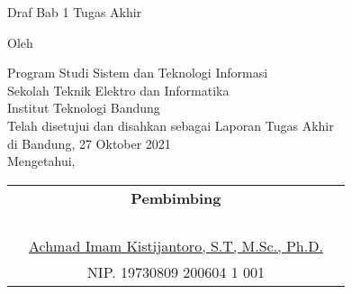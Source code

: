 \clearpage
\pagestyle{empty}

\begin{center}
    \smallskip

    \Large \bfseries \MakeUppercase{\thetitle}
    \vfill

    \Large Draf Bab 1 Tugas Akhir
    \vfill

    \large Oleh

    \Large \theauthor

    \large Program Studi Sistem dan Teknologi Informasi\\
    \normalsize \normalfont
    Sekolah Teknik Elektro dan Informatika \\
    Institut Teknologi Bandung \\

    \vfill
    \normalsize \normalfont
    Telah disetujui dan disahkan sebagai Laporan Tugas Akhir \\ di Bandung, 27 Oktober 2021 \\
    Mengetahui,

    \vfill
    \setlength{\tabcolsep}{12pt}
    \begin{tabularx}{\textwidth}{c@{\hskip 0.2\textwidth}cc@{\hskip 0.3\textwidth}}
         & {\bfseries Pembimbing}                                  & \\
         &                                                         & \\
         &                                                         & \\
         &                                                         & \\
         &                                                         & \\
         & \underline{Achmad Imam Kistijantoro, S.T, M.Sc., Ph.D.} & \\
         & NIP. 19730809 200604 1 001                              &
    \end{tabularx}

\end{center}
\clearpage
